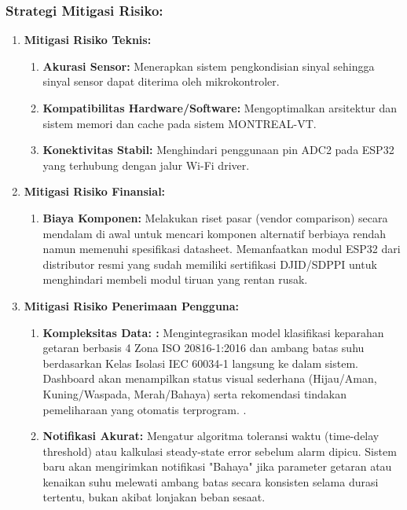 \documentclass{elsinta}
\begin{document}
\subsubsection*{Strategi Mitigasi Risiko:}
\begin{enumerate}
    \item \textbf{Mitigasi Risiko Teknis:}
    \begin{enumerate}
        \item \textbf{Akurasi Sensor:} Menerapkan sistem pengkondisian sinyal sehingga sinyal sensor dapat diterima oleh mikrokontroler.
        \item \textbf{Kompatibilitas Hardware/Software:} Mengoptimalkan arsitektur dan sistem memori dan cache pada sistem MONTREAL-VT. 
        \item \textbf{Konektivitas  Stabil:} Menghindari penggunaan pin ADC2 pada ESP32 yang terhubung dengan jalur Wi-Fi driver. 
    \end{enumerate}
    \item \textbf{Mitigasi Risiko Finansial:}
    \begin{enumerate}
        \item \textbf{Biaya Komponen:} Melakukan riset pasar (vendor comparison) secara mendalam di awal untuk mencari komponen alternatif berbiaya rendah namun memenuhi spesifikasi datasheet. Memanfaatkan modul ESP32 dari distributor resmi yang sudah memiliki sertifikasi DJID/SDPPI untuk menghindari membeli modul tiruan yang rentan rusak. 
    \end{enumerate}
    \item \textbf{Mitigasi Risiko Penerimaan Pengguna:}
    \begin{enumerate}
        \item \textbf{Kompleksitas Data: :} Mengintegrasikan model klasifikasi keparahan getaran berbasis 4 Zona ISO 20816-1:2016 dan ambang batas suhu berdasarkan Kelas Isolasi IEC 60034-1 langsung ke dalam sistem. Dashboard akan menampilkan status visual sederhana (Hijau/Aman, Kuning/Waspada, Merah/Bahaya) serta rekomendasi tindakan pemeliharaan yang otomatis terprogram. .
        \item \textbf{Notifikasi Akurat:} Mengatur algoritma toleransi waktu (time-delay threshold) atau kalkulasi steady-state error sebelum alarm dipicu. Sistem baru akan mengirimkan notifikasi "Bahaya" jika parameter getaran atau kenaikan suhu melewati ambang batas secara konsisten selama durasi tertentu, bukan akibat lonjakan beban sesaat. 
 
    \end{enumerate}
\end{enumerate}
\end{document}
